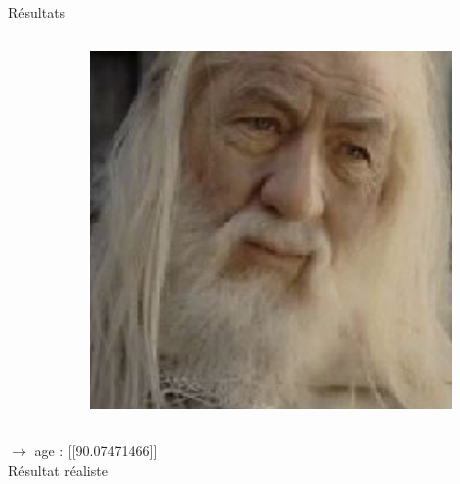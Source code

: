 \documentclass[compress]{beamer}
\begin{document}
\begin{frame}{Résultats}
  \begin{columns}
    \begin{column}{0.6\linewidth}
      \inputminted[fontsize=\scriptsize]{python}{code5.py}
    \end{column}
    \begin{column}{0.4\linewidth}
      \centering
      \includegraphics[width=\linewidth]{resources/gandalf}
    \end{column}
  \end{columns}
    $\rightarrow$ age : [[90.07471466]]\\
    Résultat réaliste
\end{frame}
\end{document}
